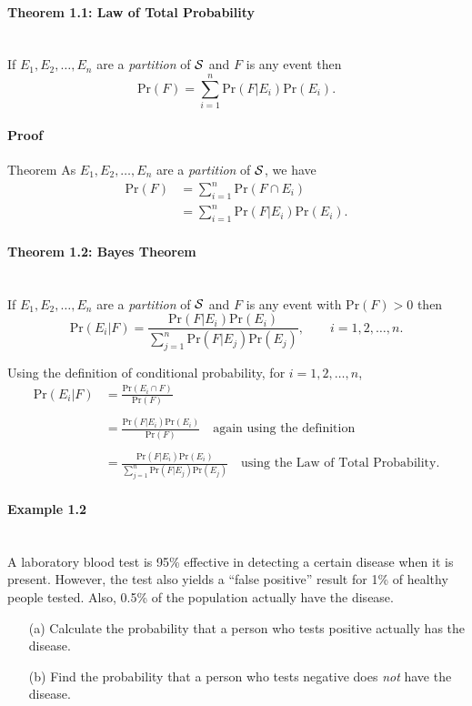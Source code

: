 \paragraph{Theorem 1.1: Law of Total Probability}{~\\
If $E_1,E_2,\ldots,E_n$ are a {\it partition} of ${\cal S}$ and $F$ is
any event then
$$
\text{Pr}(F)=\sum_{i=1}^n \text{Pr}(F|E_i)\text{Pr}(E_i).
$$}
\paragraph{Proof}{Theorem}{}
As $E_1,E_2,\ldots,E_n$ are a {\it partition} of ${\cal S}$, we have
\begin{align*}
\text{Pr}(F)&=\sum_{i=1}^n \text{Pr}(F\cap E_i) \\
&=\sum_{i=1}^n \text{Pr}(F|E_i)\text{Pr}(E_i).
\end{align*}
\paragraph{Theorem 1.2: Bayes Theorem}{~\\
If $E_1,E_2,\ldots,E_n$ are a {\it partition} of ${\cal S}$ and $F$ is
any event with $\text{Pr}(F)>0$ then
$$\text{Pr}(E_i|F)=\frac{\text{Pr}(F|E_i)\text{Pr}(E_i)}{\sum_{j=1}^n \text{Pr}(F|E_j)\text{Pr}(E_j)},
\quad\quad i=1,2,\ldots,n. $$}

\begin{gapbox}


{
Using the definition of conditional probability, for $i=1,2,\ldots,n$,
\begin{align*}
\text{Pr}(E_i|F)&=\frac{\text{Pr}(E_i\cap F)}{\text{Pr}(F)} \\
                & \\
&=\frac{\text{Pr}(F|E_i)\text{Pr}(E_i)}{\text{Pr}(F)} \quad\text{again using the
definition}\\ 
            & \\
&=\frac{\text{Pr}(F|E_i)\text{Pr}(E_i)}{\sum_{j=1}^n \text{Pr}(F|E_j)\text{Pr}(E_j)}
\quad\text{using the Law of Total Probability}.
\end{align*}
}

\end{gapbox}




\paragraph{Example 1.2}{~\\
A laboratory blood test is 95\% effective in detecting a certain
disease when it is present. However, the test also yields a ``false
positive'' result for 1\% of healthy people tested. Also, 0.5\% of the
population actually have the disease.

\begin{itemize}
\item [(a)] Calculate the probability that a person who tests positive actually has the disease.
\item [(b)] Find the probability that a person who tests negative does \textit{not} have the disease.
\end{itemize}}


